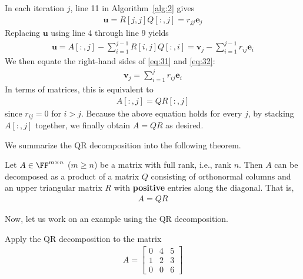 \documentclass[thmcnt=section, color=blue, 12pt]{my-elegantbook}
\begin{document}
In each iteration $j$, line 11 in Algorithm~\ref{alg:2} gives
\begin{align}
    \mathbf{u}
    = R[j,j] Q[:, j]
    = r_{jj} \mathbf{e}_j
    \label{eq:31}
\end{align}
Replacing $\mathbf{u}$ using line 4 through line 9 yields
\begin{align}
    \mathbf{u} 
    = A[:, j] - \sum_{i=1}^{j-1} R[i,j] Q[:, i]
    = \mathbf{v}_j - \sum_{i=1}^{j-1} r_{ij} \mathbf{e}_i
    \label{eq:32}
\end{align}
We then equate the right-hand sides of \eqref{eq:31} and \eqref{eq:32}:
\begin{align*}
    \mathbf{v}_j = \sum_{i=1}^j r_{ij} \mathbf{e}_i
\end{align*}
In terms of matrices, this is equivalent to 
\begin{align*}
    A[:,j] = Q R[:, j]
\end{align*}
since $r_{ij} = 0$ for $i > j$. Because the above equation holds for every $j$, by stacking $A[:,j]$ together, we finally obtain $A = QR$ as desired.

We summarize the QR decomposition into the following theorem.

\begin{theorem}[QR Decomposition]
    Let $A \in \FF^{m \times n}$ ($m \geq n$) be a matrix with full rank, i.e., rank $n$. Then $A$ can be decomposed as a product of a matrix $Q$ consisting of orthonormal columns and an upper triangular matrix $R$ with \textbf{positive} entries along the diagonal. That is, 
    \begin{align*}
        A = Q R
    \end{align*}
\end{theorem}


Now, let us work on an example using the QR decomposition.

\begin{exercise}
    Apply the QR decomposition to the matrix
    \begin{align*}
        A = \begin{bmatrix}
            0 & 4 & 5 \\ 
            1 & 2 & 3 \\ 
            0 & 0 & 6
        \end{bmatrix}
    \end{align*}
\end{exercise}
\end{document}
